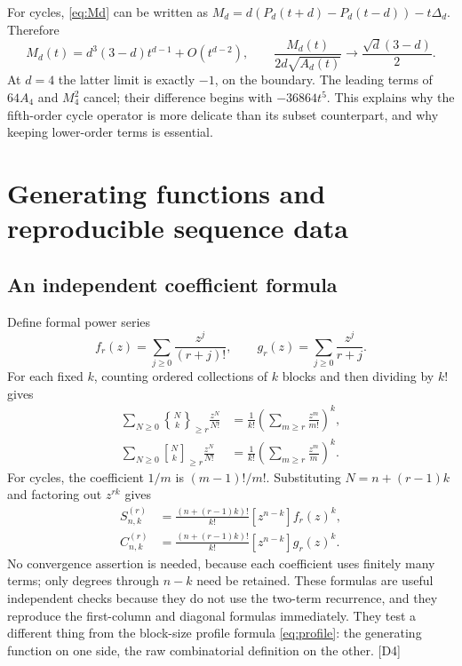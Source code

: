 \documentclass[11pt,a4paper]{article}
\numberwithin{equation}{section}
\theoremstyle{definition}
\theoremstyle{remark}
\newcommand{\Snum}[3]{S^{(#1)}_{#2,#3}}
\newcommand{\Cnum}[3]{C^{(#1)}_{#2,#3}}
\newcommand{\assocS}[3]{\genfrac\{\}{0pt}{}{#1}{#2}_{\!\ge #3}}
\newcommand{\assocC}[3]{\genfrac[]{0pt}{}{#1}{#2}_{\!\ge #3}}
\newcommand{\dup}[1]{{\small\textsf{\color{MutedInk}[#1]}}}
\begin{document}
For cycles, \eqref{eq:Md} can be written as
$M_d=d(P_d(t+d)-P_d(t-d))-t\Delta_d$. Therefore
\begin{equation}\label{eq:asym-M}
 M_d(t)=d^3(3-d)t^{d-1}+O(t^{d-2}),\qquad
 \frac{M_d(t)}{2d\sqrt{A_d(t)}}\longrightarrow
                         \frac{\sqrt d(3-d)}2.
\end{equation}
At $d=4$ the latter limit is exactly $-1$, on the boundary.
The leading terms of $64A_4$ and $M_4^2$ cancel; their difference begins
with $-36864t^5$. This explains why the fifth-order cycle operator is
more delicate than its subset counterpart, and why keeping lower-order
terms is essential.

\section{Generating functions and reproducible sequence data}\label{sec:gf}

\subsection{An independent coefficient formula}

Define formal power series
\begin{equation}\label{eq:fg}
 f_r(z)=\sum_{j\ge0}\frac{z^j}{(r+j)!},\qquad
 g_r(z)=\sum_{j\ge0}\frac{z^j}{r+j}.
\end{equation}
For each fixed $k$, counting ordered collections of $k$ blocks and then
dividing by $k!$ gives
\begin{align}
 \sum_{N\ge0}\assocS Nkr\frac{z^N}{N!}
  &=\frac1{k!}\left(\sum_{m\ge r}\frac{z^m}{m!}\right)^k,
                                                       \label{eq:associated-S-egf}\\
 \sum_{N\ge0}\assocC Nkr\frac{z^N}{N!}
  &=\frac1{k!}\left(\sum_{m\ge r}\frac{z^m}{m}\right)^k.
                                                       \label{eq:associated-C-egf}
\end{align}
For cycles, the coefficient $1/m$ is $(m-1)!/m!$.
Substituting $N=n+(r-1)k$ and factoring out $z^{rk}$ gives
\begin{align}
 \Snum rnk&=\frac{(n+(r-1)k)!}{k!}[z^{n-k}]f_r(z)^k,
                                                       \label{eq:S-coefficient}\\
 \Cnum rnk&=\frac{(n+(r-1)k)!}{k!}[z^{n-k}]g_r(z)^k.
                                                       \label{eq:C-coefficient}
\end{align}
No convergence assertion is needed, because each coefficient uses finitely
many terms; only degrees through $n-k$ need be retained.
These formulas are useful independent checks because they do not use the
two-term recurrence, and they reproduce the first-column and diagonal
formulas immediately. They test a different thing from the block-size
profile formula \eqref{eq:profile}: the generating function on one side,
the raw combinatorial definition on the other. \dup{D4}
\end{document}

